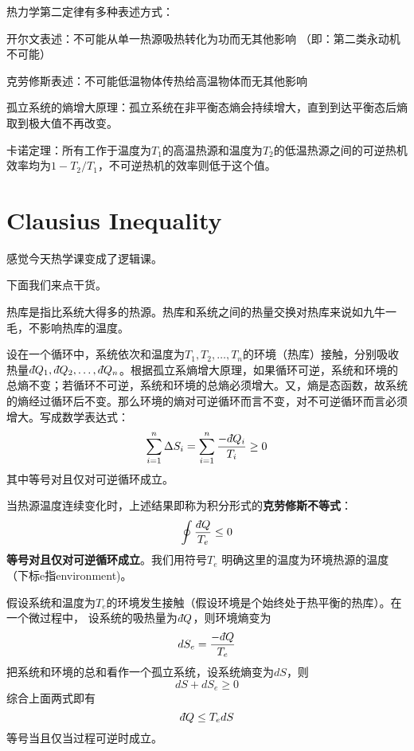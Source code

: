 \documentclass[CJK]{beamer}
\begin{document}
\begin{frame}
\bch
热力学第二定律有多种表述方式：
\bitem
\item{开尔文表述：不可能从单一热源吸热转化为功而无其他影响 （即：第二类永动机不可能）}
\item{克劳修斯表述：不可能低温物体传热给高温物体而无其他影响}
\item{孤立系统的熵增大原理：孤立系统在非平衡态熵会持续增大，直到到达平衡态后熵取到极大值不再改变。}
\item{卡诺定理：所有工作于温度为$T_1$的高温热源和温度为$T_2$的低温热源之间的可逆热机效率均为$1-T_2/T_1$，不可逆热机的效率则低于这个值。}
\eitem
\ech
\end{frame}

\section{Clausius Inequality}

\begin{frame}
\bch
\wulian 感觉今天热学课变成了逻辑课。

\skiplines

下面我们来点干货。
\ech
\end{frame}


\begin{frame}
\bch
热库是指比系统大得多的热源。热库和系统之间的热量交换对热库来说如九牛一毛，不影响热库的温度。

\ech
\end{frame}


\begin{frame}
\bch
{\small
设在一个循环中，系统依次和温度为$T_1, T_2, \ldots, T_n$的环境（热库）接触，分别吸收热量$\dbar Q_1, \dbar Q_2, \ldots, \dbar Q_n$。根据孤立系熵增大原理，如果循环可逆，系统和环境的总熵不变；若循环不可逆，系统和环境的总熵必须增大。又，熵是态函数，故系统的熵经过循环后不变。那么环境的熵对可逆循环而言不变，对不可逆循环而言必须增大。写成数学表达式：
$$\sum_{i=1}^n \Delta S_i = \sum_{i=1}^n \frac{-\dbar Q_i}{T_i} \ge 0$$
其中等号对且仅对可逆循环成立。

当热源温度连续变化时，上述结果即称为积分形式的{\bf 克劳修斯不等式}：
{\blue $$\oint \frac{\dbar Q}{T_e} \le 0 $$}
{\bf 等号对且仅对可逆循环成立}。我们用符号$T_e$ 明确这里的温度为环境热源的温度（下标e指environment)。
}
\ech
\end{frame}


\begin{frame}
\bch
假设系统和温度为$T_e$的环境发生接触（假设环境是个始终处于热平衡的热库）。在一个微过程中，
设系统的吸热量为$\dbar Q$，则环境熵变为
$$ dS_e = \frac{-\dbar Q}{T_e}$$
把系统和环境的总和看作一个孤立系统，设系统熵变为$dS$，则
$$dS +dS_e \ge 0$$
综合上面两式即有
{\blue $$\dbar Q \le T_e dS $$
等号当且仅当过程可逆时成立}。
\ech
\end{frame}
\end{document}
